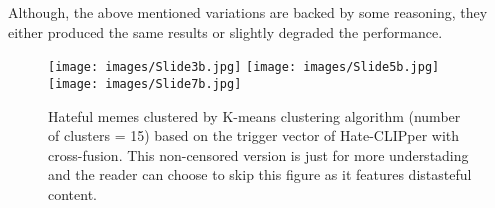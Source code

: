 \documentclass[11pt]{article}
\begin{document}
Although, the above mentioned variations are backed by some reasoning, they either produced the same results or slightly degraded the performance. 

\begin{figure*}[]
\centering
   \texttt{[image: images/Slide3b.jpg]}
   \texttt{[image: images/Slide5b.jpg]}
   \texttt{[image: images/Slide7b.jpg]}
   \caption{Hateful memes clustered by K-means clustering algorithm (number of clusters = 15) based on the trigger vector of Hate-CLIPper with cross-fusion. This non-censored version is just for more understading and the reader can choose to skip this figure as it features distasteful content.}
   \label{fig:memes-exp}
\end{figure*}
\end{document}
